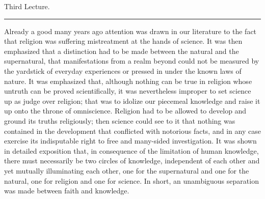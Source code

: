 \documentclass[12pt,a4paper,openany]{book}
\newcommand{\opage}[1]{\marginnote{\footnotesize\textit{[#1]}}}
\newcommand{\lecture}[1]{\clearpage\begin{center}{\large #1}\\[0.4em]\rule{3em}{0.4pt}\end{center}\medskip\noindent}
\begin{document}
\setcounter{footnote}{0}%
\lecture{Third Lecture.}\opage{28}

Already a good many years ago attention was drawn in our literature to the fact that religion was suffering mistreatment at the hands of science. It was then emphasized that a distinction had to be made between the natural and the supernatural, that manifestations from a realm beyond could not be measured by the yardstick of everyday experiences or pressed in under the known laws of nature. It was emphasized that, although nothing can be true in religion whose untruth can be proved scientifically, it was nevertheless improper to set science up as judge over religion; that was to idolize our piecemeal knowledge and raise it up onto the throne of omniscience. Religion had to be allowed to develop and ground its truths religiously; then science could see to it that nothing was contained in the development that conflicted with notorious facts, and in any case exercise its indisputable right to free and many-sided investigation. It was shown in detailed exposition that, in consequence of the limitation of human knowledge, there must necessarily be two circles of knowledge, independent of each other and yet mutually illuminating each other, one for the supernatural and one for the natural, one for religion and one for
\setcounter{footnote}{0}%
\opage{29}science. In short, an unambiguous separation was made between faith and knowledge.
\end{document}
